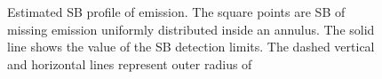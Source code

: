 \documentclass[twocolumn]{aastex61}
\begin{document}
\begin{figure}
\centering
{}
\caption{ Estimated SB profile of  emission. The square points are SB of missing  emission uniformly distributed inside an annulus. The solid line shows the value of the SB detection limits. The dashed vertical and horizontal lines represent outer radius of }
\label{fig.emission}
\end{figure}


\newpage

\end{document}
